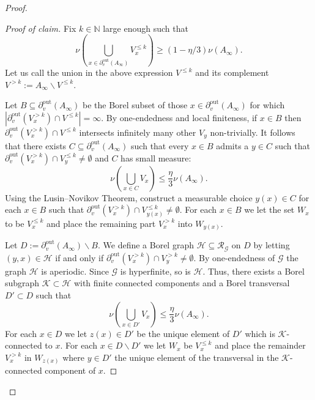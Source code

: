 \documentclass[10pt,a4paper]{amsart}
\renewcommand{\geq}{\geqslant}
\renewcommand{\leq}{\leqslant}
\begin{document}
\begin{proof}
\begin{proof}[Proof of claim]
     Fix $k\in \mathbb N$ large enough such that $$
    \nu \left(\bigcup_{x\in \partial_v^{\mathrm{out}} (A_\infty)} V_x^{\leq k}\right) \geq (1 - \eta/3) \nu (A_\infty).
    $$
    Let us call the union in the above expression $V^{\leq k}$ and its complement $V^{>k} := A_\infty \backslash V^{\leq k}$.
    
    Let $B \subseteq \partial_v^{\mathrm{out}} (A_\infty)$ be the Borel subset of those $x\in \partial_v^{\mathrm{out}} (A_\infty)$ for which $|\partial_v^{\mathrm{out}} (V_x^{>k}) \cap V^{\leq k} | = \infty$. By one-endedness and local finiteness, if $x \in B$ then $\partial_v^{\mathrm{out}} (V_x^{>k}) \cap V^{\leq k}$ intersects infinitely many other $V_y$ non-trivially. It follows that there exists $C \subseteq \partial_v^{\mathrm{out}} (A_\infty)$ such that every $x \in B$ admits a $y \in C$ such that $\partial_v^{\mathrm{out}} (V_x^{>k}) \cap V_y^{\leq k} \neq \emptyset$ and $C$ has small measure:
    $$
    \nu \left(\bigcup_{x\in C} V_x\right) \leq \frac{\eta}{3} \nu (A_\infty).
    $$
    Using the Lusin--Novikov Theorem, construct a measurable choice $y(x) \in C$ for each $x\in B$ such that $\partial_v^{\mathrm{out}} (V_x^{>k}) \cap V_{y(x)}^{\leq k} \neq \emptyset$. For each $x\in B$ we let the set $W_x$ to be $V_x^{\leq k}$ and place the remaining part $V_x^{> k}$ into $W_{y(x)}$. 
    

    Let $D := \partial_v^{\mathrm{out}} (A_\infty) \backslash B$. We define a Borel graph $\mathcal H\subseteq\mathcal{R}_{\mathcal{G}}$ on $D$ by letting $(y,x) \in \mathcal H$ if and only if $\partial_v^{\mathrm{out}} (V_x^{> k}) \cap V^{> k}_y \neq \emptyset$. By one-endedness of $\mathcal{G}$ the graph $\mathcal{H}$ is aperiodic. Since $\mathcal G$ is hyperfinite, so is $\mathcal H$. Thus, there exists a Borel subgraph $\mathcal K \subset \mathcal H$ with finite connected components and a Borel transversal $D' \subset D$ such that 
    $$
    \nu \left(\bigcup_{x\in D'} V_x\right) \leq \frac{\eta}{3} \nu (A_\infty).
    $$
    For each $x\in D$ we let $z(x) \in D'$ be the unique element of $D'$ which is $\mathcal K$-connected to $x$. For each $x\in D \backslash D'$ we let $W_x$ be $V_x^{\leq k}$ and place the remainder $V_x^{>k}$ in $W_{z(x)}$ where $y \in D'$ the unique element of the transversal in the $\mathcal K$-connected component of $x$. 


\end{proof}
\end{proof}
\end{document}
